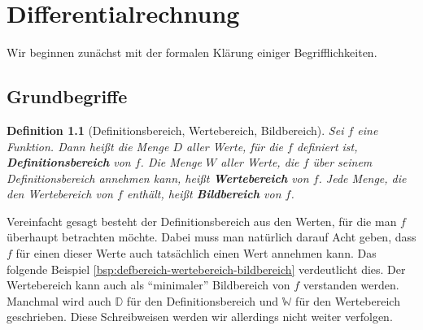 \documentclass[11pt,reqno, a4paper]{book}
\renewcommand{\textbf}[1]{{\normalfont\bf #1}}
\theoremstyle{mystyle}
\newtheorem{definition}[theorem]{Definition}
\theoremstyle{definition}
\numberwithin{equation}{chapter}
\begin{document}
\chapter{Differentialrechnung}
Wir beginnen zunächst mit der formalen  Klärung einiger Begrifflichkeiten. 

\section{Grundbegriffe}
\begin{definition}[Definitionsbereich, Wertebereich, Bildbereich]
    Sei \(f\) eine Funktion. Dann heißt die Menge \(D\) aller Werte, für die \(f\) definiert ist, \textbf{Definitionsbereich} von \(f\). Die Menge \(W\) aller Werte, die \(f\) über seinem Definitionsbereich annehmen kann, heißt \textbf{Wertebereich} von \(f\). Jede Menge, die den Wertebereich von \(f\) enthält, heißt \textbf{Bildbereich} von \(f\). 
\end{definition}
Vereinfacht gesagt besteht der Definitionsbereich aus den Werten, für die man \(f\) überhaupt betrachten möchte. Dabei muss man natürlich darauf Acht geben, dass \(f\) für einen dieser Werte auch tatsächlich einen Wert annehmen kann. Das folgende Beispiel \ref{bsp:defbereich-wertebereich-bildbereich} verdeutlicht dies. Der Wertebereich kann auch als "`minimaler"' Bildbereich von \(f\) verstanden werden. Manchmal wird auch \(\mathbb D\) für den Definitionsbereich und \(\mathbb W\) für den Wertebereich geschrieben. Diese Schreibweisen werden wir allerdings nicht weiter verfolgen. 
\end{document}
